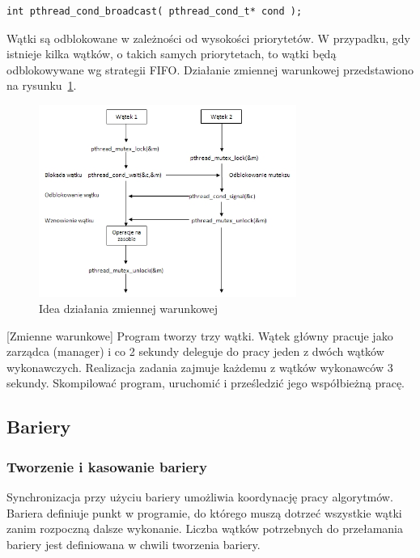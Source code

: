 \begin{lstlisting}[style=MyCStyle]
int pthread_cond_broadcast( pthread_cond_t* cond );
\end{lstlisting}

Wątki są odblokowane w zależności od wysokości priorytetów. W przypadku, gdy istnieje kilka wątków, o takich samych priorytetach, to wątki będą odblokowywane wg strategii FIFO. Działanie zmiennej warunkowej przedstawiono na rysunku~\ref{fig:condvar}.

\begin{figure}[!h]
\centering
\includegraphics[width=0.75\textwidth]{img/condvar}
\caption{Idea działania zmiennej warunkowej}
\label{fig:condvar}
\end{figure}

\begin{example}{[Zmienne warunkowe]}
Program tworzy trzy wątki. Wątek główny pracuje jako zarządca (manager) i co 2 sekundy deleguje do pracy jeden z dwóch wątków wykonawczych. Realizacja zadania zajmuje każdemu z wątków wykonawców 3 sekundy. Skompilować program, uruchomić i prześledzić jego współbieżną pracę.

\end{example}

\subsection{Bariery}

\subsubsection{Tworzenie i kasowanie bariery}

Synchronizacja przy użyciu bariery umożliwia koordynację pracy algorytmów. Bariera definiuje punkt w programie, do którego muszą dotrzeć wszystkie wątki zanim rozpoczną dalsze wykonanie. Liczba wątków potrzebnych do przełamania bariery jest definiowana w chwili tworzenia bariery.

